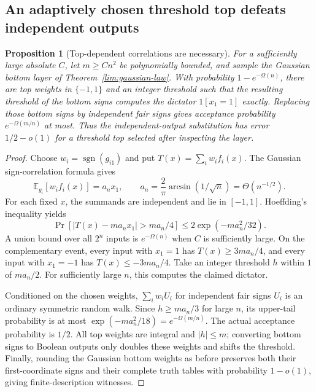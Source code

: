 \documentclass[11pt,letterpaper]{article}
\newtheorem{proposition}[theorem]{Proposition}
\theoremstyle{definition}
\theoremstyle{remark}
\begin{document}
\subsection{An adaptively chosen threshold top defeats independent outputs}
\label{lim:adaptive-thr}

\begin{proposition}[Top-dependent correlations are necessary]
\label{lim:adaptive-counterexample}
For a sufficiently large absolute $C$, let $m\ge Cn^2$ be polynomially
bounded, and sample the Gaussian bottom layer of
Theorem~\ref{lim:gaussian-law}.  With probability $1-e^{-\Omega(n)}$,
there are top weights in $\{-1,1\}$ and an integer threshold such that
the resulting threshold of the bottom signs computes the dictator
$1[x_1=1]$ exactly.  Replacing those bottom signs by independent fair
signs gives acceptance probability $e^{-\Omega(m/n)}$ at most.  Thus
the independent-output substitution has error $1/2-o(1)$ for a threshold
top selected after inspecting the layer.
\end{proposition}

\begin{proof}
Choose $w_i=\operatorname{sgn}(g_{i1})$ and put
$T(x)=\sum_iw_if_i(x)$.  The Gaussian sign-correlation formula gives
\[
 \mathbb E_{g_i}[w_if_i(x)]=a_nx_1,
 \qquad a_n=\frac2\pi\arcsin(1/\sqrt n)=\Theta(n^{-1/2}).
\]
For each fixed $x$, the summands are independent and lie in $[-1,1]$.
Hoeffding's inequality yields
\[
 \Pr[|T(x)-ma_nx_1|>ma_n/4]
 \le2\exp(-ma_n^2/32).
\]
A union bound over all $2^n$ inputs is $e^{-\Omega(n)}$ when $C$ is
sufficiently large.  On the complementary event, every input with
$x_1=1$ has $T(x)\ge3ma_n/4$, and every input with $x_1=-1$ has
$T(x)\le-3ma_n/4$.  Take an integer threshold $h$ within $1$ of
$ma_n/2$.  For sufficiently large $n$, this computes the claimed dictator.

Conditioned on the chosen weights, $\sum_iw_iU_i$ for independent fair
signs $U_i$ is an ordinary symmetric random walk.  Since $h\ge ma_n/3$
for large $n$, its upper-tail probability is at most
$\exp(-ma_n^2/18)=e^{-\Omega(m/n)}$.  The actual acceptance probability
is $1/2$.  All top weights are integral and $|h|\le m$; converting bottom
signs to Boolean outputs only doubles these weights and shifts the
threshold.  Finally, rounding the Gaussian bottom weights as before
preserves both their first-coordinate signs and their complete truth
tables with probability $1-o(1)$, giving finite-description witnesses.
\end{proof}
\end{document}
